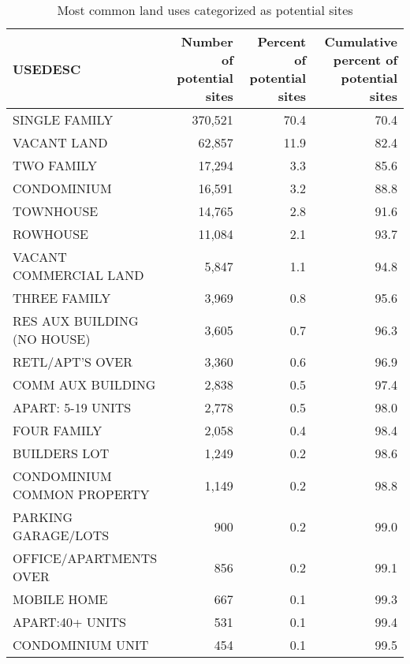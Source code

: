 \documentclass[
]{book}
\theoremstyle{definition}
\theoremstyle{definition}
\theoremstyle{definition}
\theoremstyle{definition}
\theoremstyle{remark}
\begin{document}
\begin{table}

\caption{\label{tab:list-site-uses}Most common land uses categorized as potential sites}
\centering
\begin{tabular}[t]{lrrr}
\toprule
USEDESC & Number of potential sites & Percent of potential sites & Cumulative percent of potential sites\\
\midrule
SINGLE FAMILY & 370,521 & 70.4 & 70.4\\
VACANT LAND & 62,857 & 11.9 & 82.4\\
TWO FAMILY & 17,294 & 3.3 & 85.6\\
CONDOMINIUM & 16,591 & 3.2 & 88.8\\
TOWNHOUSE & 14,765 & 2.8 & 91.6\\
\addlinespace
ROWHOUSE & 11,084 & 2.1 & 93.7\\
VACANT COMMERCIAL LAND & 5,847 & 1.1 & 94.8\\
THREE FAMILY & 3,969 & 0.8 & 95.6\\
RES AUX BUILDING (NO HOUSE) & 3,605 & 0.7 & 96.3\\
RETL/APT'S OVER & 3,360 & 0.6 & 96.9\\
\addlinespace
COMM AUX BUILDING & 2,838 & 0.5 & 97.4\\
APART: 5-19 UNITS & 2,778 & 0.5 & 98.0\\
FOUR FAMILY & 2,058 & 0.4 & 98.4\\
BUILDERS LOT & 1,249 & 0.2 & 98.6\\
CONDOMINIUM COMMON PROPERTY & 1,149 & 0.2 & 98.8\\
\addlinespace
PARKING GARAGE/LOTS & 900 & 0.2 & 99.0\\
OFFICE/APARTMENTS OVER & 856 & 0.2 & 99.1\\
MOBILE HOME & 667 & 0.1 & 99.3\\
APART:40+ UNITS & 531 & 0.1 & 99.4\\
CONDOMINIUM UNIT & 454 & 0.1 & 99.5\\
\bottomrule
\end{tabular}
\end{table}
\end{document}
